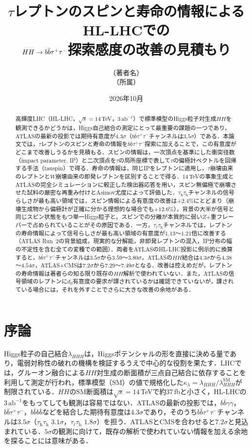 \documentclass[paper=a4,fontsize=10pt,jafontsize=10pt,line_length=44zw,number_of_lines=46]{jlreq}
\title{$\tau$レプトンのスピンと寿命の情報によるHL-LHCでの\\$HH\to\bbtt$探索感度の改善の見積もり}
\author{（著者名）\\（所属）}
\date{2026年10月}
\newcommand{\tauh}{\tau_{\mathrm{h}}}
\newcommand{\taul}{\tau_{\ell}}
\newcommand{\bbtt}{b\bar b\tau^+\tau^-}
\newcommand{\abinv}{\,\mathrm{ab}^{-1}}
\begin{document}
\maketitle

\begin{abstract}
高輝度LHC（HL-LHC，$\sqrt{s}=14$\,TeV，$3\abinv$）で標準模型のHiggs粒子対生成$HH$を観測できるかどうかは，Higgs自己結合の測定にとって最重要の課題の一つであり，ATLASの最新の投影では期待有意度が$4.3\sigma$（$\bbtt$チャンネルは$3.5\sigma$）である．本論文では，$\tau$レプトンのスピンと寿命の情報を$\bbtt$探索に加えることで，この有意度がどこまで改善しうるかを見積もる．スピンの情報は，一次頂点を基準にした衝突径数（impact parameter, IP）と二次頂点を$\tau$の局所座標で表して$\tau$の偏極計ベクトルを回帰する手法（tauspin）で得る．寿命の情報は，同じIPをレプトンに適用し，$\tau$崩壊由来のレプトンと$W$崩壊由来の即発レプトンを区別することで得る．14\,TeVの事象生成とATLASの完全シミュレーションに較正した検出器応答を用い，スピン無偏極で崩壊させた試料の厳密な再重み付けとAsimov尤度によって評価した．$\tauh\tauh$チャンネルの信号らしさが最も高い領域では，スピン情報による有意度の改善は$+2.4\%$にとどまり（崩壊生成物から偏極計が正確に分かる理想的な場合でも$+12.6\%$），背景の大半が信号と同じスピン状態をもつ単一Higgs粒子と，スピンでの分離が本質的に弱い$Z$+重フレーバーで占められていることがその原因である．一方，$\taul\tauh$チャンネルでは，レプトンの寿命情報によって信号らしさが最も高い領域の有意度が$1.13$〜$1.21$倍に改善する（ATLAS Run~2の背景組成，現実的な分解能，非即発レプトンの混入，IP分布の幅の不定性を含む全ての変種での範囲）．両者をATLASのHL-LHC投影に例示的に換算すると，$\bbtt$チャンネルは$3.5\sigma$から$3.59$〜$3.80\sigma$，ATLASの$HH$結合は$4.3\sigma$から$4.38$〜$4.54\sigma$，ATLAS+CMSは$7.2\sigma$から$7.29$〜$7.49\sigma$となる．改善は控えめだが，レプトンの寿命情報は著者らの知る限り既存の$HH$解析で使われていない．また，ATLASの信号領域のレプトンに$d_0$有意度の要求が課されているかは確認できていないが，課されている場合には，それを外すことでさらに大きな改善の余地がある．
\end{abstract}

\section{序論}

Higgs粒子の自己結合$\lambda_{HHH}$は，Higgsポテンシャルの形を直接に決める量であり，電弱対称性の破れの機構を検証するうえで中心的な役割を果たす．LHCでは，グルーオン融合による$HH$対生成の断面積が三点自己結合に依存することを利用して測定が行われ，標準模型（SM）の値で規格化した$\kappa_\lambda=\lambda_{HHH}/\lambda_{HHH}^{\mathrm{SM}}$が制限されている\cite{Glover:1987nx,Dawson:1998py}．$HH$のSM断面積は$\sqrt s=14$\,TeVで約$37$\,fbと小さく，HL-LHCの$3\abinv$をもってしても観測は容易ではない．ATLASの最新の投影では，$b\bar b\gamma\gamma$，$\bbtt$，$b\bar bb\bar b$などを結合した期待有意度は$4.3\sigma$であり，そのうち$\bbtt$チャンネルは$3.5\sigma$（$\tauh\tauh$ $3.1\sigma$，$\taul\tauh$ $1.8\sigma$）を担う\cite{ATL-PHYS-PUB-2025-018,ATL-PHYS-PUB-2024-016}．ATLASとCMSを合わせると$7.2\sigma$と見込まれている\cite{ATL-PHYS-PUB-2025-018}．$5\sigma$の観測に向けて，既存の解析で使われていない情報を加える余地を探ることには意味がある．
\end{document}

